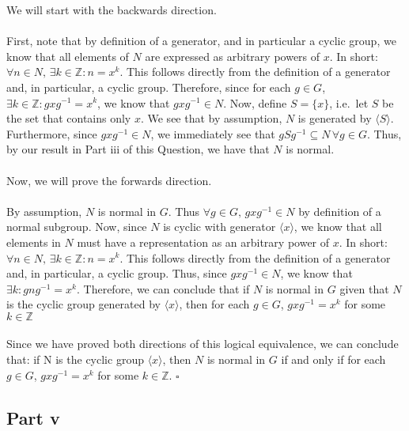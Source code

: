 \documentclass[letterpaper]{article}
\newcommand*{\QED}{\hfill\ensuremath{\square}}%
\begin{document}
We will start with the backwards direction.
\\ \\
First, note that by definition of a generator, and in particular a cyclic group, we know that all elements of $ N $ are expressed as arbitrary powers of $ x $.
In short: $ \forall n \in N, \, \exists k \in \mathbb{Z} : n = x^k $.
This follows directly from the definition of a generator and, in particular, a cyclic group.
Therefore, since for each $ g \in G $, $ \exists k \in \mathbb{Z} : gxg^{-1} = x^k $, we know that $ gxg^{-1} \in N $.
Now, define $ S = \{x\} $, i.e.\ let $ S $ be the set that contains only $ x $.
We see that by assumption, $ N $ is generated by $ \langle S \rangle $.
Furthermore, since $ gxg^{-1} \in N $, we immediately see that $ gSg^{-1} \subseteq N \, \forall g \in G $.
Thus, by our result in Part iii of this Question, we have that $ N $ is normal.
\\ \\
Now, we will prove the forwards direction.
\\ \\
By assumption, $ N $ is normal in $ G $.
Thus $ \forall g \in G,\, gxg^{-1} \in N $ by definition of a normal subgroup.
Now, since $ N $ is cyclic with generator $ \langle x \rangle $, we know that all elements in $ N $ must have a representation as an arbitrary power of $ x $.
In short: $ \forall n \in N, \, \exists k \in \mathbb{Z} : n = x^k $.
This follows directly from the definition of a generator and, in particular, a cyclic group.
Thus, since $ gxg^{-1} \in N $, we know that $ \exists k : gng^{-1} = x^k $.
Therefore, we can conclude that if $ N $ is normal in $ G $ given that $ N $ is the cyclic group generated by $ \langle x \rangle $, then for each $ g \in G $, $ gxg^{-1} = x^k $ for some $ k \in \mathbb{Z} $
\\ \\
Since we have proved both directions of this logical equivalence, we can conclude that: if N is the cyclic group $ \langle x \rangle $, then $ N $ is normal in $ G $ if and only if for each $ g \in G $, $ gxg^{-1} = x^k $ for some $ k \in \mathbb{Z} $.
\QED{}

\subsection{Part v}
\label{sub:1Partv}
\end{document}
